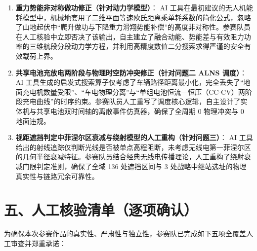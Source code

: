 \documentclass[fontset=windows, 12pt, a4paper]{ctexart}
\begin{document}
\begin{enumerate}
  \item \textbf{重力势能非对称做功修正（针对动力学模型）}：
  AI 工具在最初建议的无人机能耗模型中，机械地套用了二维平面等速欧氏距离乘单耗系数的简化公式，忽略了山地起伏中“爬升做功与下降重力滑翔势能补偿”的高度非对称性。参赛队员在人工核验中立即否决了该输出，自主建立了融合动能、势能差与有效阻力功率的三维航段分段动力学方程，并利用高精度数值二分搜索求得严谨的安全有效载荷上界。
  
  \item \textbf{共享电池充放电两阶段与物理时空防冲突修正（针对问题二 ALNS 调度）}：
  AI 工具生成的启发式搜索算子仅考虑了车辆路径距离最小化，完全丢失了“地面充电机数量受限”、“车电物理分离”与“单组电池恒流—恒压（CC-CV）两阶段充电曲线”的时序约束。参赛队员人工重写了调度核心逻辑，自主设计了实体机与共享电池双时间轴的离散事件仿真器，确保了全周期 0 物理冲突与 0 地面违规。
  
  \item \textbf{视距遮挡判定中菲涅尔区衰减与绕射模型的人工重构（针对问题三）}：
  AI 工具给出的射线追踪仅判断光线是否被单点高程阻断，未考虑无线电第一菲涅尔区的几何半径衰减特征。参赛队员结合经典无线电传播理论，人工重构了绕射衰减门限判定准则，确保了全域 136 处遮挡区间与 3 处战略中继站选址的物理真实性与链路冗余可靠性。
\end{enumerate}

\section*{五、人工核验清单（逐项确认）}

为确保本次参赛作品的真实性、严肃性与独立性，参赛队已完成如下五项全覆盖人工审查并郑重承诺：
\end{document}
